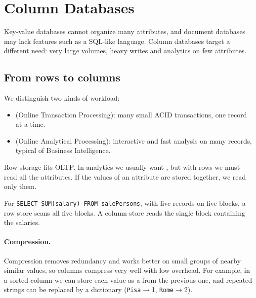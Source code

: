 \section{Column Databases}\label{sec:column}

Key-value databases cannot organize many attributes, and document databases may lack features such as a SQL-like language. Column databases target a different need: very large volumes, heavy writes and analytics on few attributes.

\subsection{From rows to columns}
We distinguish two kinds of workload:
\begin{itemize}
  \item {} (Online Transaction Processing): many small ACID transactions, one record at a time.
  \item {} (Online Analytical Processing): interactive and fast analysis on many records, typical of Business Intelligence.
\end{itemize}
Row storage fits OLTP. In analytics we usually want , but with rows we must read all the attributes. If the values of an attribute are stored together, we read only them.

\begin{example}
For \texttt{SELECT SUM(salary) FROM salePersons}, with five records on five blocks, a row store scans all five blocks. A column store reads the single block containing the salaries.
\end{example}

\begin{center}
\end{center}

\paragraph{Compression.} Compression removes redundancy and works better on small groups of nearby similar values, so columns compress very well with low overhead. For example, in a sorted column we can store each value as a  from the previous one, and repeated strings can be replaced by a dictionary (\texttt{Pisa}$\to$1, \texttt{Rome}$\to$2).

